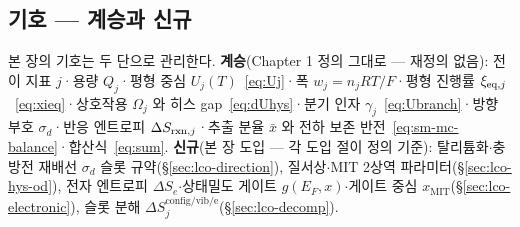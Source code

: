 \subsection*{기호 --- 계승과 신규}
본 장의 기호는 두 단으로 관리한다. \textbf{계승}(Chapter 1 정의 그대로 --- 재정의 없음):
전이 지표 $j$·용량 $Q_j$·평형 중심 $U_j(T)$~\eqref{eq:Uj}·폭 $w_j=n_jRT/F$·평형 진행률
$\xi_{\mathrm{eq},j}$~\eqref{eq:xieq}·상호작용 $\Omega_j$ 와 히스 gap~\eqref{eq:dUhys}·분기 인자
$\gamma_j$~\eqref{eq:Ubranch}·방향 부호 $\sigma_d$·반응 엔트로피 $\Delta S_{\mathrm{rxn},j}$·추출 분율
$\bar x$ 와 전하 보존 반전~\eqref{eq:sm-mc-balance}·합산식~\eqref{eq:sum}. \textbf{신규}(본 장
도입 --- 각 도입 절이 정의 기준): 탈리튬화$\cdot$충방전 재배선 $\sigma_d$ 슬롯 규약(\S\ref{sec:lco-direction}),
질서상$\cdot$MIT 2상역 파라미터(\S\ref{sec:lco-hys-od}), 전자 엔트로피 $\Delta S_e$$\cdot$상태밀도
게이트 $g(E_F,x)$$\cdot$게이트 중심 $x_\mathrm{MIT}$(\S\ref{sec:lco-electronic}), 슬롯 분해
$\Delta S^\mathrm{config/vib/e}_j$(\S\ref{sec:lco-decomp}).
